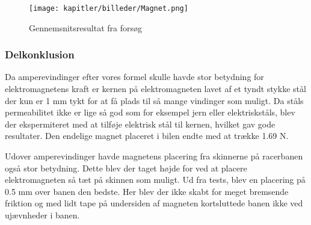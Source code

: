 \begin{figure}[ht]
	\centering
	\texttt{[image: kapitler/billeder/Magnet.png]}
	\caption{Gennemsnitsresultat fra forsøg}
	\label{fig:Magnet}
\end{figure}


\subsubsection{Delkonklusion}
Da amperevindinger efter vores formel skulle havde stor betydning for elektromagnetens kraft er kernen på elektromagneten lavet af et tyndt stykke stål der kun er 1 mm tykt for at få plads til så mange vindinger som muligt. Da ståls permeabilitet ikke er lige så god som for eksempel jern eller elektriskståls, blev der ekspermiteret med at tilføje elektrisk stål til kernen, hvilket gav gode resultater. Den endelige magnet placeret i bilen endte med at trække 1.69 N.

Udover amperevindinger havde magnetens placering fra skinnerne på racerbanen også stor betydning. Dette blev der taget højde for ved at placere elektromagneten så tæt på skinnen som muligt. Ud fra tests, blev en placering på 0.5 mm over banen den bedste. Her blev der ikke skabt for meget bremsende friktion og med lidt tape på undersiden af magneten kortsluttede banen ikke ved ujævnheder i banen.

